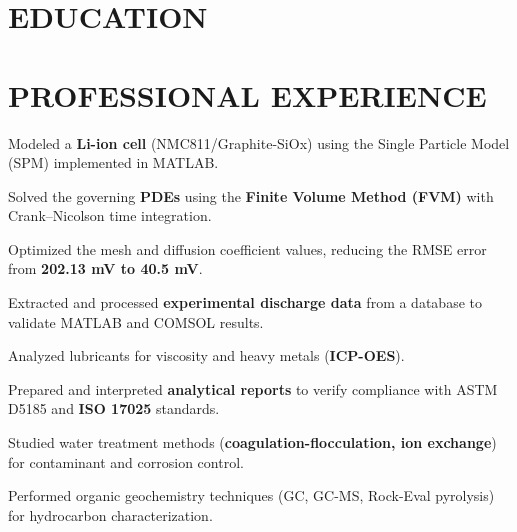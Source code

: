 \documentclass[10pt]{article}
\begin{document}

\section{EDUCATION}

\section{PROFESSIONAL EXPERIENCE}
\begin{bul}
\item Modeled a \textbf{Li-ion cell} (NMC811/Graphite-SiOx) using the Single Particle Model (SPM) implemented in MATLAB.
\item Solved the governing \textbf{PDEs} using the \textbf{Finite Volume Method (FVM)} with Crank–Nicolson time integration.
\item Optimized the mesh and diffusion coefficient values, reducing the RMSE error from \textbf{202.13 mV to 40.5 mV}.
\item Extracted and processed \textbf{experimental discharge data} from a database to validate MATLAB and COMSOL results.
\end{bul}
\begin{bul}
\item Analyzed lubricants for viscosity and heavy metals (\textbf{ICP-OES}).
\item Prepared and interpreted \textbf{analytical reports} to verify compliance with ASTM D5185 and \textbf{ISO 17025} standards.
\end{bul}
\begin{bul}
\item Studied water treatment methods (\textbf{coagulation-flocculation, ion exchange}) for contaminant and corrosion control.
\item Performed organic geochemistry techniques (GC, GC-MS, Rock-Eval pyrolysis) for hydrocarbon characterization.
\end{bul}
\end{document}
